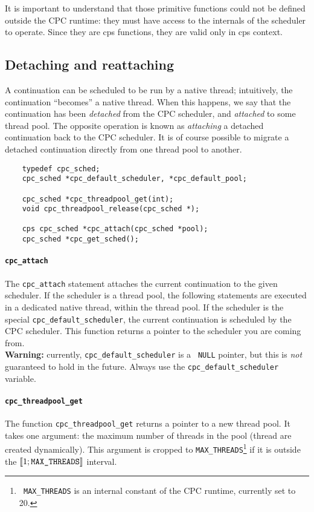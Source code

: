 \documentclass[a4paper]{report}
\begin{document}
It is important to understand that those primitive functions could not
be defined outside the CPC runtime: they must have access to the
internals of the scheduler to operate.  Since they are cps functions,
they are valid only in cps context.

\subsection{Detaching and reattaching} \label{sec:native-threads}

A continuation can be scheduled to be run by a native thread; intuitively,
the continuation ``becomes'' a native thread.  When this happens, we say
that the continuation has been {\em detached\/} from the CPC scheduler,
and {\em attached\/} to some thread pool.  The opposite operation is
known as {\em attaching\/} a detached continuation back to the CPC
scheduler.  It is of course possible to migrate a detached continuation
directly from one thread pool to another.

\begin{verbatim}
    typedef cpc_sched;
    cpc_sched *cpc_default_scheduler, *cpc_default_pool;

    cpc_sched *cpc_threadpool_get(int);
    void cpc_threadpool_release(cpc_sched *);

    cps cpc_sched *cpc_attach(cpc_sched *pool);
    cpc_sched *cpc_get_sched();
\end{verbatim}


\paragraph{\tt cpc\_attach} The {\tt cpc\_attach} statement
attaches the current continuation to the given scheduler.  If the
scheduler is a thread pool, the following statements are executed in a
dedicated native thread, within the thread pool.  If the scheduler is
the special {\tt cpc\_default\_scheduler}, the current continuation is
scheduled by the CPC scheduler.  This function returns a pointer to the
scheduler you are coming from.\\
{\bf Warning:\/} currently, {\tt cpc\_default\_scheduler} is a {\tt
NULL} pointer, but this is {\em not\/} guaranteed to hold in the future.
Always use the {\tt cpc\_default\_scheduler} variable.

\paragraph{\tt cpc\_threadpool\_get} The function {\tt cpc\_threadpool\_get}
returns a pointer to a new thread pool.  It takes one argument: the
maximum number of threads in the pool (thread are created dynamically).
This argument is cropped to {\tt MAX\_THREADS}\footnote{{\tt
MAX\_THREADS} is an internal constant of the CPC runtime, currently set
to 20.} if it is outside the $\llbracket 1; \mbox{\tt
MAX\_THREADS}\rrbracket$ interval.
\end{document}
